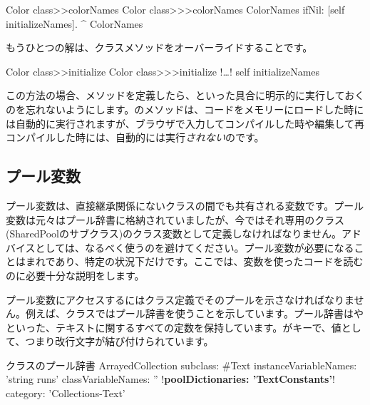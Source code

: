 \documentclass[a4paper,10pt,twoside]{book}
\begin{document}
\begin{method}[colorclasscolornames]{Color class>>colorNames}
Color class>>>colorNames	
	ColorNames ifNil: [self initializeNames].
	^ ColorNames
\end{method}	

もうひとつの解は、クラスメソッドをオーバーライドすることです。

\begin{method}[colorclassinit]{Color class>>initialize}
Color class>>>initialize	
	!\ldots!
	self initializeNames
\end{method}	

\noindent
この方法の場合、メソッドを定義したら、といった具合に明示的に実行しておくのを忘れないようにします。のメソッドは、コードをメモリーにロードした時には自動的に実行されますが、ブラウザで入力してコンパイルした時や編集して再コンパイルした時には、自動的には実行\emph{されない}のです。

\subsection{プール変数}
プール変数は、直接継承関係にないクラスの間でも共有される変数です。プール変数は元々はプール辞書に格納されていましたが、今ではそれ専用のクラス(SharedPoolのサブクラス)のクラス変数として定義しなければなりません。アドバイスとしては、なるべく使うのを避けてください。プール変数が必要になることはまれであり、特定の状況下だけです。ここでは、変数を使ったコードを読むのに必要十分な説明をします。

プール変数にアクセスするにはクラス定義でそのプールを示さなければなりません。例えば、クラスではプール辞書を使うことを示しています。プール辞書はやといった、テキストに関するすべての定数を保持しています。がキーで、値として、つまり改行文字が結び付けられています。

\begin{classdef}[textpooldict]{クラスのプール辞書}
ArrayedCollection subclass: #Text
        instanceVariableNames: 'string runs' 	
        classVariableNames: '' 	
        !\textbf{poolDictionaries: 'TextConstants'}!
        category: 'Collections-Text'
\end{classdef}
   
\end{document}
